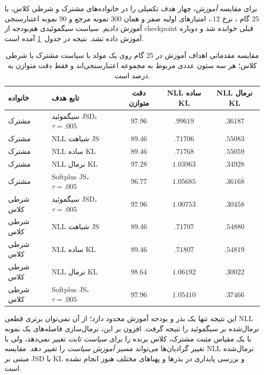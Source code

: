 برای مقایسه \emph{آموزش}، چهار هدف تکمیلی را در
خانواده‌های مشترک و شرطی کلاس، با $25$ گام
، نرخ $.12$، امتیازهای اولیه صفر و
همان $300$ نمونه مرجع و $90$ نمونه اعتبارسنجی
آموزش دادیم. سیاست سیگموئیدی هم‌بودجه
از checkpoint قبلی خوانده شد و دوباره آموزش داده نشد.
نتیجه در جدول~\ref{tab:ch4-v1-new-objectives} آمده است.
\begin{table}[htbp]
\centering\small
\caption{مقایسه مقدماتی اهداف آموزش در $25$ گام روی یک مولد
با سیاست مشترک یا شرطی کلاس؛ هر سه ستون عددی مربوط به
مجموعه اعتبارسنجی‌اند و فقط دقت متوازن به درصد است.}
\label{tab:ch4-v1-new-objectives}
\begin{tabular}{llccc}\hline
خانواده & تابع هدف & دقت متوازن & NLL ساده KL & NLL نرمال KL\\\hline
مشترک & سیگموئید JSD، $\tau=.005$ & $97.96$ & $.99619$ & $.36187$\\
مشترک & NLL شباهت JS & $89.46$ & $.71706$ & $.55083$\\
مشترک & NLL ساده KL & $89.46$ & $.71768$ & $.55059$\\
مشترک & NLL نرمال KL & $97.28$ & $1.03963$ & $.34928$\\
مشترک & Softplus JS، $\tau=.005$ & $96.77$ & $1.05685$ & $.36168$\\
شرطی کلاس & سیگموئید JSD، $\tau=.005$ & $97.96$ & $1.00753$ & $.30458$\\
شرطی کلاس & NLL شباهت JS & $89.46$ & $.71707$ & $.54880$\\
شرطی کلاس & NLL ساده KL & $89.46$ & $.71807$ & $.54819$\\
شرطی کلاس & NLL نرمال KL & $98.64$ & $1.06192$ & $.30022$\\
شرطی کلاس & Softplus JS، $\tau=.005$ & $97.96$ & $1.05410$ & $.37466$\\\hline
\end{tabular}
\end{table}
این نتیجه تنها یک بذر و بودجه آموزش محدود دارد؛
از آن نمی‌توان برتری قطعی NLL نرمال‌شده بر سیگموئید
را نتیجه گرفت. افزون بر این، نرمال‌سازی فاصله‌های
یک نمونه با یک مقیاس مثبت مشترک، کلاس برنده را برای
\emph{سیاست ثابت} تغییر نمی‌دهد، ولی با تغییر
گرادیان‌ها می‌تواند مسیر \emph{آموزش سیاست} را تغییر دهد.
مقایسه NLL نرمال‌شده مبتنی بر JSD با KL و بررسی
پایداری در بذرها و پهناهای مختلف هنوز انجام نشده است.

